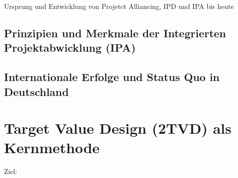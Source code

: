Ursprung und Entwicklung von Projetct Alliancing, IPD und IPA bis heute

\subsection{Prinzipien und Merkmale der Integrierten Projektabwicklung (IPA)}
\label{sec:2.2.2}

\subsection{Internationale Erfolge und Status Quo in Deutschland}
\label{sec:2.2.3}

\clearpage

\section{Target Value Design (2TVD) als Kernmethode}
\label{sec: 2.3}
Ziel: